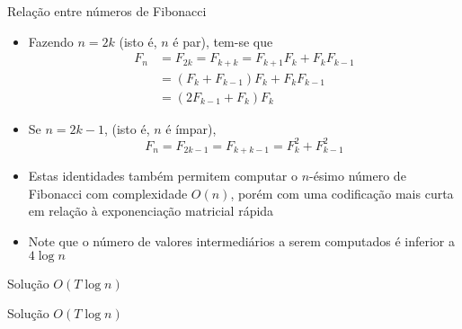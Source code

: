 \begin{frame}[fragile]{Relação entre números de Fibonacci}

    \begin{itemize}
        \item Fazendo $n = 2k$ (isto é, $n$ é par), tem-se que
        \begin{align*}
            F_n &= F_{2k} = F_{k + k} = F_{k + 1}F_k + F_kF_{k - 1} \\
            &= (F_k + F_{k - 1})F_k + F_kF_{k - 1} \\
            &= (2F_{k - 1} + F_k)F_k
        \end{align*}

        \item Se $n = 2k - 1$, (isto é, $n$ é ímpar), 
        \[
            F_n = F_{2k - 1} = F_{k + k - 1} = F_{k}^2 + F_{k - 1}^2
        \]

        \item Estas identidades também permitem computar o $n$-ésimo número de Fibonacci com
            complexidade $O(n)$, porém com uma codificação mais curta em relação à exponenciação
            matricial rápida

        \item Note que o número de valores intermediários a serem computados é inferior a
            $4\log n$
    \end{itemize}

\end{frame}

\begin{frame}[fragile]{Solução $O(T\log n)$}
\end{frame}

\begin{frame}[fragile]{Solução $O(T\log n)$}
\end{frame}
